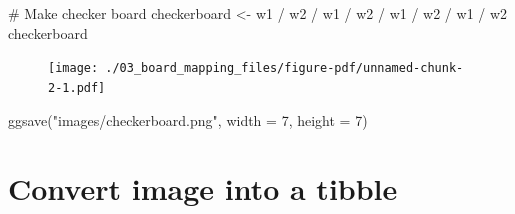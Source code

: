 \documentclass[
  letterpaper,
  DIV=11,
  numbers=noendperiod]{scrreprt}
\newenvironment{Shaded}{\begin{snugshade}}{\end{snugshade}}
\newcommand{\AttributeTok}[1]{\textcolor[rgb]{0.40,0.45,0.13}{#1}}
\newcommand{\CommentTok}[1]{\textcolor[rgb]{0.37,0.37,0.37}{#1}}
\newcommand{\DecValTok}[1]{\textcolor[rgb]{0.68,0.00,0.00}{#1}}
\newcommand{\FunctionTok}[1]{\textcolor[rgb]{0.28,0.35,0.67}{#1}}
\newcommand{\NormalTok}[1]{\textcolor[rgb]{0.00,0.23,0.31}{#1}}
\newcommand{\OtherTok}[1]{\textcolor[rgb]{0.00,0.23,0.31}{#1}}
\newcommand{\SpecialCharTok}[1]{\textcolor[rgb]{0.37,0.37,0.37}{#1}}
\newcommand{\StringTok}[1]{\textcolor[rgb]{0.13,0.47,0.30}{#1}}
\begin{document}
\begin{Shaded}
\begin{Highlighting}[]
\CommentTok{\# Make checker board}
\NormalTok{checkerboard }\OtherTok{\textless{}{-}}\NormalTok{ w1 }\SpecialCharTok{/}\NormalTok{ w2 }\SpecialCharTok{/}\NormalTok{ w1 }\SpecialCharTok{/}\NormalTok{ w2 }\SpecialCharTok{/}\NormalTok{ w1 }\SpecialCharTok{/}\NormalTok{ w2 }\SpecialCharTok{/}\NormalTok{ w1 }\SpecialCharTok{/}\NormalTok{ w2}
\NormalTok{checkerboard}
\end{Highlighting}
\end{Shaded}

\begin{figure}[H]

{\centering \texttt{[image: ./03\_board\_mapping\_files/figure-pdf/unnamed-chunk-2-1.pdf]}

}

\end{figure}

\begin{Shaded}
\begin{Highlighting}[]
\FunctionTok{ggsave}\NormalTok{(}\StringTok{"images/checkerboard.png"}\NormalTok{, }\AttributeTok{width =} \DecValTok{7}\NormalTok{, }\AttributeTok{height =} \DecValTok{7}\NormalTok{)}
\end{Highlighting}
\end{Shaded}

\hypertarget{convert-image-into-a-tibble}{%
\section{Convert image into a
tibble}\label{convert-image-into-a-tibble}}
\end{document}
